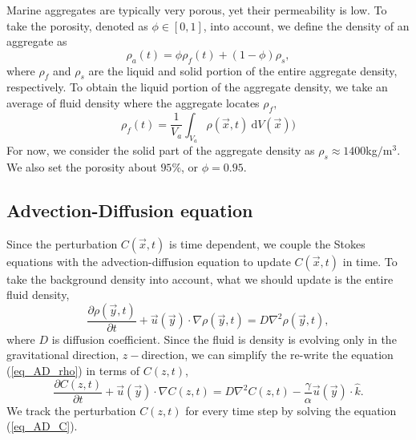 Marine aggregates are typically very porous, yet their permeability is low. To take the porosity, denoted as $\phi \in [0,1]$, into account, we define the density of an aggregate as 
\begin{equation}
	\rho_a (t) = \phi \rho_{f}(t) + (1-\phi) \rho_{s},
	\label{eq_rho_a}
\end{equation}
where $\rho_{f}$ and $\rho_s$ are the liquid and solid portion of the entire aggregate density, respectively. To obtain the liquid portion of the aggregate density, we take an average of fluid density where the aggregate locates $\rho_{f},$
\begin{equation}
	\rho_{f}(t) = \frac{1}{V_a}\int_{V_a} \rho(\vec{x}, t) \  \textrm{d}V(\vec{x}))
\end{equation}
For now, we consider the solid part of the aggregate density as $\rho_s \approx 1400 $kg$/$m$^3.$ 
We also set the porosity about $95\%$, or $\phi = 0.95$.


\subsection{Advection-Diffusion equation}
Since the perturbation $C(\vec{x}, t)$ is time dependent, we couple the Stokes equations with the advection-diffusion equation to update $C(\vec{x}, t)$ in time. To take the background density into account, what we should update is the entire fluid density,
\begin{equation}
	\frac{\partial \rho(\vec{y},t)}{\partial t}
	+ \vec{u}(\vec{y}) \cdot \nabla \rho(\vec{y},t)
	 = D \nabla^2 \rho(\vec{y},t),
\label{eq_AD_rho}
\end{equation}
where $D$ is diffusion coefficient. 
Since the fluid is density is evolving only in the gravitational direction, $z-$direction, we can simplify the re-write the equation (\ref{eq_AD_rho}) in terms of $C(z,t)$, 
\begin{equation}
	\frac{\partial C(z,t)}{\partial t}
	+ \vec{u}(\vec{y}) \cdot \nabla C(z,t)
	 = D \nabla^2 C(z,t)
	 - \frac{\gamma}{\alpha}\vec{u}(\vec{y})  \cdot \hat{k}.
\label{eq_AD_C}
\end{equation}
We track the perturbation $C(z,t)$ for every time step by solving the equation (\ref{eq_AD_C}).
